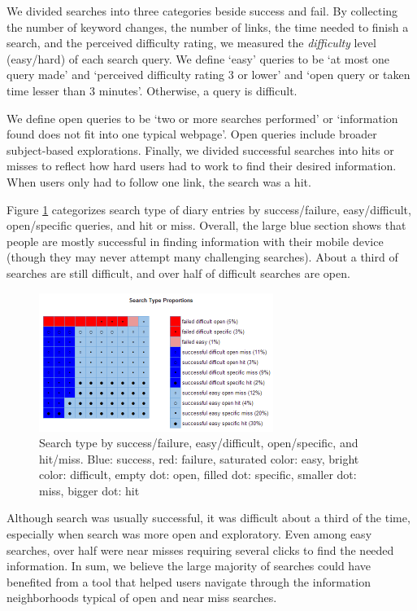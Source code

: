 We divided searches into three categories beside success and fail. By collecting the number of keyword changes, the number of links, the time needed to finish a search, and the perceived difficulty rating, we measured the \emph{difficulty} level (easy/hard) of each search query. We define `easy' queries to be `at most one query made' and `perceived difficulty rating 3 or lower' and `open query or taken time lesser than 3 minutes'. Otherwise, a query is difficult.

We define open queries to be `two or more searches performed' or `information found does not fit into one typical webpage'. Open queries include broader subject-based explorations. Finally, we divided successful searches into hits or misses to reflect how hard users had to work to find their desired information. When users only had to follow one link, the search was a hit. 


Figure \ref{fig:searchtype} categorizes search type of diary entries by success/failure, easy/difficult, open/specific queries, and hit or miss. Overall, the large blue section shows that people are mostly successful in finding information with their mobile device (though they may never attempt many challenging searches). About a third of searches are still difficult, and over half of difficult searches are open. 


\begin{figure}[ht]
\centering
\includegraphics[width=3in]{images/searchtype}
\caption{Search type by success/failure, easy/difficult, open/specific, and hit/miss. Blue: success, red: failure, saturated color: easy, bright color: difficult, empty dot: open, filled dot: specific, smaller dot: miss, bigger dot: hit}
\label{fig:searchtype}
\end{figure}

Although search was usually successful, it was difficult about a third of the time, especially when search was more open and exploratory. Even among easy searches, over half were near misses requiring several clicks to find the needed information. In sum, we believe the large majority of searches could have benefited from a tool that helped users navigate through the information neighborhoods typical of open and near miss searches. 
